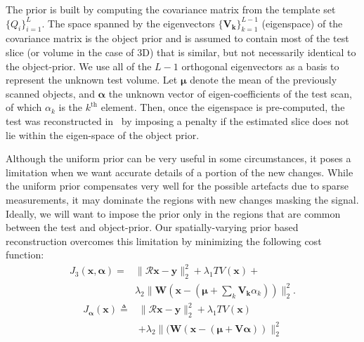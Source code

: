 \documentclass[journal]{IEEEtran}
\def\x{{\mathbf x}}
\begin{document}
The prior is built by computing the covariance matrix from the
template set $\{Q_i\}_{i=1}^L$. The space spanned by the eigenvectors
$\{\boldsymbol{V_k}\}_{k=1}^{L-1}$ (eigenspace) of the covariance
matrix is the object prior and is assumed to contain most of the test
slice (or volume in the case of 3D) that is similar, but not
necessarily identical to the object-prior. We use all of the $L-1$
orthogonal eigenvectors as a basis to represent the unknown test
volume. Let $\boldsymbol{\mu}$ denote the mean of the previously
scanned objects, and $\boldsymbol{\alpha}$ the unknown vector of
eigen-coefficients of the test scan, of which $\alpha_k$ is the
$k^{\textrm{th}}$ element. Then, once the eigenspace is pre-computed,
the test was reconstructed in~\cite{my_dicta_paper} by imposing a
penalty if the estimated slice does not lie within the eigen-space of
the object prior.


Although the uniform prior can be very useful in some circumstances,
it poses a limitation when we want accurate details of a portion of
the new changes. While the uniform prior compensates very well for the
possible artefacts due to sparse measurements, it may dominate the
regions with new changes masking the signal. Ideally, we will want to
impose the prior only in the regions that are common between the test
and object-prior.  Our spatially-varying prior based reconstruction
overcomes this limitation by minimizing the following cost function:
\begin{equation}
  \begin{split}
  J_3(\boldsymbol{x},\boldsymbol{\alpha}) = &\lVert\boldsymbol{\mathcal{R} x}-\boldsymbol{y}\rVert_2^2  + \lambda_1TV(\boldsymbol{x}) +\\
  &\lambda_2\lVert\boldsymbol{W}(\boldsymbol{x} - (\boldsymbol{\mu} + \sum_{k}\boldsymbol{V_k}\alpha_k))\rVert_2^2.
  \label{eq:spatially_varying_prior}
  \end{split}
\end{equation}
\begin{equation}
  \begin{split}
    J_{\boldsymbol{\alpha}}(\boldsymbol{\x}) \triangleq &\lVert\boldsymbol{\mathcal{R} x- y}\rVert_2^2  + \lambda_1TV(\boldsymbol{x}) \\
    &+\lambda_2\lVert(\boldsymbol{W}(\boldsymbol{x} - (\boldsymbol{\mu + V\alpha}))\rVert_2^2
  \end{split}
  \end{equation}
  
\end{document}
